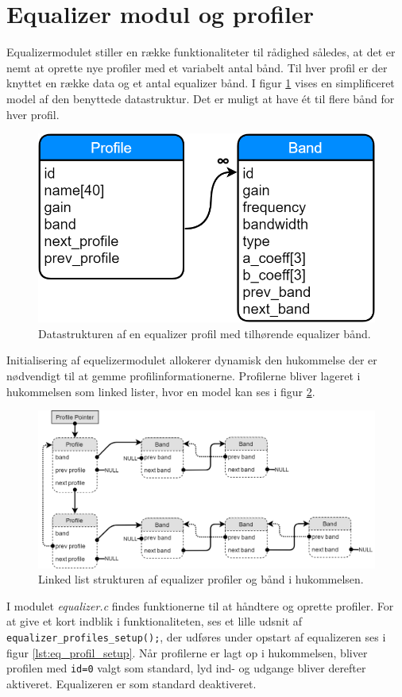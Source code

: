 \section{Equalizer modul og profiler}

Equalizermodulet stiller en række funktionaliteter til rådighed således, at det er nemt at oprette nye profiler med et variabelt antal bånd.
Til hver profil er der knyttet en række data og et antal equalizer bånd.
I figur \ref{fig:eq-profile-db} vises en simplificeret model af den benyttede datastruktur.
Det er muligt at have ét til flere bånd for hver profil.

\begin{figure}[h!]
	\centering
	\includegraphics[width=.4\textwidth]{billeder/eq_profile_db.png}
	\caption{Datastrukturen af en equalizer profil med tilhørende equalizer bånd.}
	\label{fig:eq-profile-db}
\end{figure}

Initialisering af equelizermodulet allokerer dynamisk den hukommelse der er nødvendigt til at gemme profilinformationerne.
Profilerne bliver lageret i hukommelsen som linked lister, hvor en model kan ses i figur \ref{fig:eq-profile-linked}.

\begin{figure}[h!]
	\centering
	\includegraphics[width=.9\textwidth]{billeder/eq_linked_profiles.png}
	\caption{Linked list strukturen af equalizer profiler og bånd i hukommelsen.}
	\label{fig:eq-profile-linked}
\end{figure}

I modulet \textit{equalizer.c} findes funktionerne til at håndtere og oprette profiler.
For at give et kort indblik i funktionaliteten, ses et lille udsnit af \texttt{equalizer\_profiles\_setup();}, der udføres under opstart af equalizeren ses i figur \ref{lst:eq_profil_setup}. 
Når profilerne er lagt op i hukommelsen, bliver profilen med \texttt{id=0} valgt som standard, lyd ind- og udgange bliver derefter aktiveret.
Equalizeren er som standard deaktiveret.

